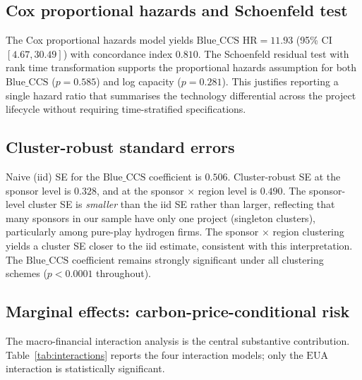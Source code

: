 \documentclass[review,authoryear,11pt]{elsarticle}
\newcommand{\HR}{\mathrm{HR}}
\newcommand{\BlueCCS}{\mathrm{Blue\_CCS}}
\newcommand{\EUA}{\mathrm{EUA}}
\begin{document}
\subsection{Cox proportional hazards and Schoenfeld test}

The Cox proportional hazards model yields $\BlueCCS$ $\HR = 11.93$ (95\% CI $[4.67, 30.49]$) with concordance index $0.810$. The Schoenfeld residual test with rank time transformation supports the proportional hazards assumption for both $\BlueCCS$ ($p = 0.585$) and log capacity ($p = 0.281$). This justifies reporting a single hazard ratio that summarises the technology differential across the project lifecycle without requiring time-stratified specifications.

\subsection{Cluster-robust standard errors}

Naive (iid) SE for the $\BlueCCS$ coefficient is $0.506$. Cluster-robust SE at the sponsor level is $0.328$, and at the sponsor $\times$ region level is $0.490$. The sponsor-level cluster SE is \emph{smaller} than the iid SE rather than larger, reflecting that many sponsors in our sample have only one project (singleton clusters), particularly among pure-play hydrogen firms. The sponsor $\times$ region clustering yields a cluster SE closer to the iid estimate, consistent with this interpretation. The $\BlueCCS$ coefficient remains strongly significant under all clustering schemes ($p < 0.0001$ throughout).

\subsection{Marginal effects: carbon-price-conditional risk}

The macro-financial interaction analysis is the central substantive contribution. Table~\ref{tab:interactions} reports the four interaction models; only the $\EUA$ interaction is statistically significant.
\end{document}
